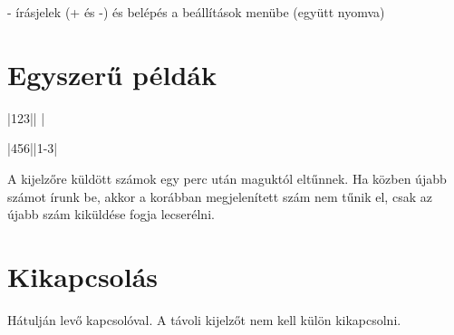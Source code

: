 \documentclass{article}
\begin{document}
\keys{{+}}-\keys{{-}} írásjelek (+ és -) és belépés a beállítások menübe (együtt nyomva)

\section*{Egyszerű példák}

   \keys{ } \dotfill {}|123||   |

     \keys{-}  \keys{ } \dotfill {}|456||1-3|

A kijelzőre küldött számok egy perc után maguktól eltűnnek. Ha közben újabb számot írunk be, akkor a korábban megjelenített szám nem tűnik el, csak az újabb szám kiküldése fogja lecserélni.

\section*{Kikapcsolás}

Hátulján levő kapcsolóval. A távoli kijelzőt nem kell külön kikapcsolni.


\end{document}
